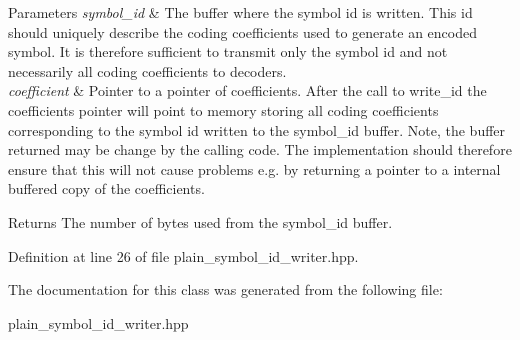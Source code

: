 \begin{DoxyParams}{Parameters}
{\em symbol\-\_\-id} & The buffer where the symbol id is written. This id should uniquely describe the coding coefficients used to generate an encoded symbol. It is therefore sufficient to transmit only the symbol id and not necessarily all coding coefficients to decoders. \\
\hline
{\em coefficient} & Pointer to a pointer of coefficients. After the call to write\-\_\-id the coefficients pointer will point to memory storing all coding coefficients corresponding to the symbol id written to the symbol\-\_\-id buffer. Note, the buffer returned may be change by the calling code. The implementation should therefore ensure that this will not cause problems e.\-g. by returning a pointer to a internal buffered copy of the coefficients.\\
\hline
\end{DoxyParams}
\begin{DoxyReturn}{Returns}
The number of bytes used from the symbol\-\_\-id buffer. 
\end{DoxyReturn}


Definition at line 26 of file plain\-\_\-symbol\-\_\-id\-\_\-writer.\-hpp.



The documentation for this class was generated from the following file\-:\begin{DoxyCompactItemize}
\item 
plain\-\_\-symbol\-\_\-id\-\_\-writer.\-hpp\end{DoxyCompactItemize}
